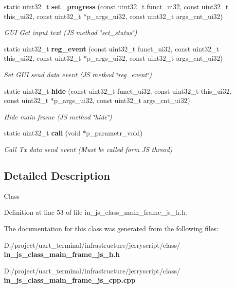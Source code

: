 \begin{DoxyCompactItemize}
static uint32\+\_\+t \textbf{ set\+\_\+progress} (const uint32\+\_\+t funct\+\_\+ui32, const uint32\+\_\+t this\+\_\+ui32, const uint32\+\_\+t $\ast$p\+\_\+args\+\_\+ui32, const uint32\+\_\+t args\+\_\+cnt\+\_\+ui32)
\begin{DoxyCompactList}\small\item\em G\+UI Get input text (JS method \char`\"{}set\+\_\+status\char`\"{}) \end{DoxyCompactList}\item 
static uint32\+\_\+t \textbf{ reg\+\_\+event} (const uint32\+\_\+t funct\+\_\+ui32, const uint32\+\_\+t this\+\_\+ui32, const uint32\+\_\+t $\ast$p\+\_\+args\+\_\+ui32, const uint32\+\_\+t args\+\_\+cnt\+\_\+ui32)
\begin{DoxyCompactList}\small\item\em Set G\+UI send data event (JS method \char`\"{}reg\+\_\+event\char`\"{}) \end{DoxyCompactList}\item 
static uint32\+\_\+t \textbf{ hide} (const uint32\+\_\+t funct\+\_\+ui32, const uint32\+\_\+t this\+\_\+ui32, const uint32\+\_\+t $\ast$p\+\_\+args\+\_\+ui32, const uint32\+\_\+t args\+\_\+cnt\+\_\+ui32)
\begin{DoxyCompactList}\small\item\em Hide main frame (JS method \char`\"{}hide\char`\"{}) \end{DoxyCompactList}\item 
static uint32\+\_\+t \textbf{ call} (void $\ast$p\+\_\+parametr\+\_\+void)
\begin{DoxyCompactList}\small\item\em Call Tx data send event (Must be called form JS thread) \end{DoxyCompactList}\end{DoxyCompactItemize}


\subsection{Detailed Description}
Class 

Definition at line 53 of file in\+\_\+js\+\_\+class\+\_\+main\+\_\+frame\+\_\+js\+\_\+h.\+h.



The documentation for this class was generated from the following files\+:\begin{DoxyCompactItemize}
\item 
D\+:/project/uart\+\_\+terminal/infrastructure/jerryscript/class/\textbf{ in\+\_\+js\+\_\+class\+\_\+main\+\_\+frame\+\_\+js\+\_\+h.\+h}\item 
D\+:/project/uart\+\_\+terminal/infrastructure/jerryscript/class/\textbf{ in\+\_\+js\+\_\+class\+\_\+main\+\_\+frame\+\_\+js\+\_\+cpp.\+cpp}\end{DoxyCompactItemize}
